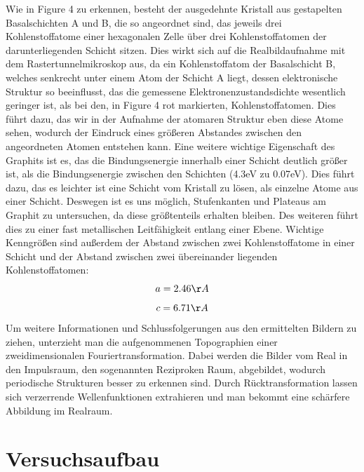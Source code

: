 \documentclass[10pt,a4paper]{article}
\begin{document}
Wie in Figure 4 zu erkennen, besteht der ausgedehnte Kristall aus gestapelten Basalschichten A und B, die so angeordnet sind, das jeweils drei Kohlenstoffatome einer hexagonalen Zelle über drei Kohlenstoffatomen der darunterliegenden Schicht sitzen. Dies wirkt sich auf die Realbildaufnahme mit dem Rastertunnelmikroskop aus, da ein Kohlenstoffatom der Basalschicht B, welches senkrecht unter einem Atom der Schicht A liegt, dessen elektronische Struktur so beeinflusst, das die gemessene Elektronenzustandsdichte wesentlich geringer ist, als bei den, in Figure 4 rot markierten, Kohlenstoffatomen. Dies führt dazu, das wir in der Aufnahme der atomaren Struktur eben diese Atome sehen, wodurch der Eindruck eines größeren Abstandes zwischen den angeordneten Atomen entstehen kann. Eine weitere wichtige Eigenschaft des Graphits ist es, das die Bindungsenergie innerhalb einer Schicht deutlich größer ist, als die Bindungsenergie zwischen den Schichten (4.3eV zu 0.07eV). Dies führt dazu, das es leichter ist eine Schicht vom Kristall zu lösen, als einzelne Atome aus einer Schicht. Deswegen ist es uns möglich, Stufenkanten und Plateaus am Graphit zu untersuchen, da diese größtenteils erhalten bleiben. Des weiteren führt dies zu einer fast metallischen Leitfähigkeit entlang einer Ebene. Wichtige Kenngrößen sind außerdem der Abstand zwischen zwei Kohlenstoffatome in einer Schicht und der Abstand zwischen zwei übereinander liegenden Kohlenstoffatomen:
$$a = 2.46 \AA$$
$$c = 6.71 \AA$$
Um weitere Informationen und Schlussfolgerungen aus den ermittelten Bildern zu ziehen, unterzieht man die aufgenommenen Topographien einer zweidimensionalen Fouriertransformation. Dabei werden die Bilder vom Real in den Impulsraum, den sogenannten Reziproken Raum, abgebildet, wodurch periodische Strukturen besser zu erkennen sind. Durch Rücktransformation lassen sich verzerrende Wellenfunktionen extrahieren und man bekommt eine schärfere Abbildung im Realraum.
  

\section{	Versuchsaufbau}
\end{document}
